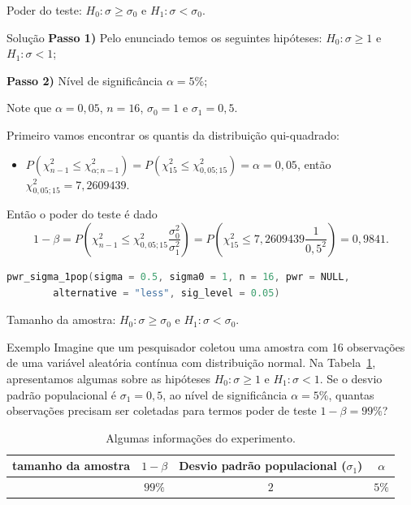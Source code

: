 \documentclass[8pt]{beamer}
\begin{document}
\begin{frame}[fragile]{Poder do teste: $H_0: \sigma \geq \sigma_0$ e $H_1: \sigma < \sigma_0$.}
\begin{block}{Solução}
	\textbf{Passo 1)} Pelo enunciado temos os seguintes hipóteses: $H_0: \sigma \geq 1 $ e $H_1: \sigma < 1$;
	
	\textbf{Passo 2)} Nível de significância $\alpha=5\%$;
	
	Note que $\alpha=0,05$, $n=16$, $\sigma_0 = 1$ e $\sigma_1 = 0,5$.
	
	Primeiro vamos encontrar os quantis da distribuição qui-quadrado:
	\begin{itemize}
		\item $P\left(  \chi_{n-1}^2 \leq \chi_{\alpha;n-1}^2 \right) = P\left(  \chi_{15}^2 \leq \chi_{0,05;15}^2 \right) = \alpha=0,05$, então $\chi_{0,05;15}^2 = 7,2609439$.
	\end{itemize}
	
	Então o poder do teste é dado
	$$1-\beta =  P \left( \chi_{n-1}^2 \leq \chi_{0,05;15}^2 \frac{\sigma_0^2}{\sigma_1^2} \right) =  P \left(\chi_{15}^2 \leq 7,2609439 \frac{1}{0,5^2}  \right) = 0,9841.$$
\end{block}

\begin{lstlisting}[language = C, caption = Código no R.]
pwr_sigma_1pop(sigma = 0.5, sigma0 = 1, n = 16, pwr = NULL,
		alternative = "less", sig_level = 0.05)
\end{lstlisting}

\end{frame}


\begin{frame}{Tamanho da amostra: $H_0: \sigma \geq \sigma_0$ e $H_1: \sigma < \sigma_0$.}

\large
\begin{block}{Exemplo}
Imagine que um pesquisador coletou uma amostra com 16 observações de uma variável aleatória contínua com distribuição normal. Na Tabela~\ref{tab:var-test-unilateral-h0-lower-sample-size}, apresentamos algumas sobre as hipóteses $H_0: \sigma \geq 1$ e $H_1: \sigma < 1$. Se o desvio padrão populacional é $\sigma_1 = 0,5$, ao nível de significância $\alpha=5\%$, quantas observações precisam ser coletadas para termos poder de teste $1-\beta=99\%$?
\begin{table}[ht]
	\centering
	\begin{tabular}{c|c|c|c}
		\toprule[0.05cm]
		tamanho da amostra &  $1-\beta$  &  Desvio padrão populacional ($\sigma_1$) & $\alpha$ \\ 
		\midrule
		& $99\%$  & $2$ & $5\%$ \\ 
		\bottomrule[0.05cm]
	\end{tabular}
	\caption{Algumas informações do experimento.} 
	\label{tab:var-test-unilateral-h0-lower-sample-size}
\end{table}
\end{block}
\normalsize
\end{frame}
\end{document}
